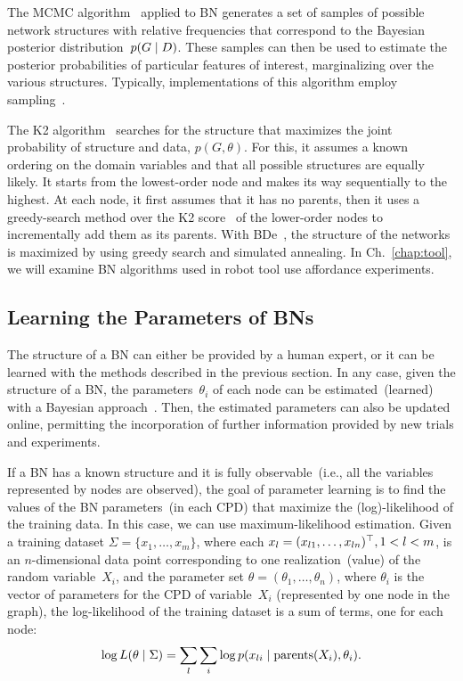The \ac{MCMC} algorithm~\cite{madigan:1995:mcmc} applied to \ac{BN} \StructureLearning{} generates a set of samples of possible network structures with relative frequencies that correspond to the Bayesian posterior distribution~$p(G \mid D)$.
These samples can then be used to estimate the posterior probabilities of particular features of interest, marginalizing over the various structures.
Typically, implementations of this algorithm employ \MH{} sampling~\cite{giudici:2003:mcmc}.

The K2 algorithm~\cite{cooper:1992:k2,bielza:2011:k2} searches for the structure that maximizes the joint probability of structure and data, $p(G, \theta)$.
For this, it assumes a known ordering on the domain variables and that all possible structures are equally likely.
It starts from the lowest-order node and makes its way sequentially to the highest.
At each node, it first assumes that it has no parents, then it uses a greedy-search method over the K2 score~\cite{cooper:1992:k2} of the lower-order nodes to incrementally add them as its parents.
With \ac{BDe}~\cite{shah:2009:pebl}, the structure of the networks is maximized by using greedy search and simulated annealing.
In Ch.~\ref{chap:tool}, we will examine \ac{BN} \StructureLearning{} algorithms used in robot tool use affordance experiments.

\subsection{Learning the Parameters of \aclp{BN}}
\label{sec:background:theory:param_learning}

The structure of a \ac{BN} can either be provided by a human expert, or it can be learned with the methods described in the previous section.
In any case, given the structure of a \ac{BN}, the parameters~$\theta_i$ of each node can be estimated~(learned) with a Bayesian approach~\cite{heckerman:1995:learnbn}.
Then, the estimated parameters can also be updated online, permitting the incorporation of further information provided by new trials and experiments.

If a \ac{BN} has a known structure and it is fully observable~(i.e., all the variables represented by nodes are observed), the goal of parameter learning is to find the values of the \ac{BN} parameters~(in each \ac{CPD}) that maximize the (log)-likelihood of the training data.
In this case, we can use maximum-likelihood estimation.
Given a training dataset $\Sigma = \{ x_1, \dots, x_m \}$, where each $x_l = (x_{l1}, \dots, x_{ln})^\top, 1 < l < m$, is an $n$-dimensional data point corresponding to one realization~(value) of the random variable~$X_i$, and the parameter set $\theta = (\theta_1, \dots, \theta_n)$, where $\theta_i$ is the vector of parameters for the \ac{CPD} of variable~$X_i$ (represented by one node in the graph), the log-likelihood of the training dataset is a sum of terms, one for each node:
\begin{equation}
  \log L(\theta \mid \Sigma) = \sum_l \sum_i \log p(x_{li} \mid \operatorname{parents}(X_i), \theta_i).
\end{equation}

